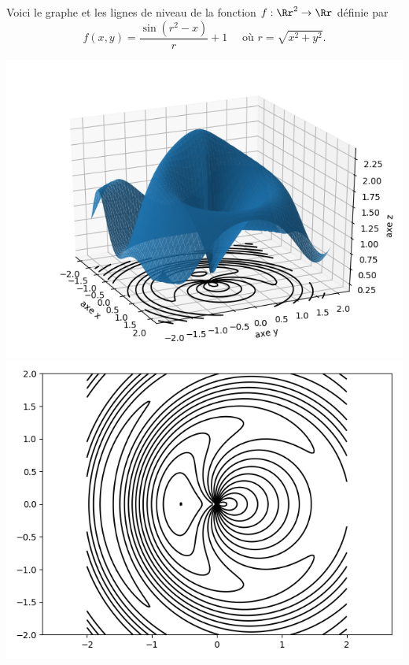 \documentclass[11pt,class=report,crop=false]{standalone}
\begin{document}
\begin{exemple}
Voici le graphe et les lignes de niveau de la fonction $f : \Rr^2 \to \Rr$ définie par
$$f(x,y) = \frac{\sin(r^2-x)}{r}+1 \quad \text{ où } r = \sqrt{x^2+y^2}.$$

\begin{center}
\includegraphics[scale=\myscale,scale=0.5]{figures/fonctions-niveau-2a}
\includegraphics[scale=\myscale,scale=0.5]{figures/fonctions-niveau-2b}
\end{center}


\end{exemple} 


\end{document}
